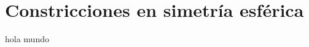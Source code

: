 \documentclass[11pt,twoside,openright,spanish]{report}
\numberwithin{equation}{chapter}
\numberwithin{figure}{chapter}
\numberwithin{table}{chapter}
\begin{document}
\fancyhead[LO]{}
\fancyhead[RE]{}
\pagestyle{fancy}

\chapter{Constricciones en simetría esférica}\label{desarrolloconstadm}

hola mundo


	\begin{comment}
	\chapter{Metodología para el Cálculo del Margen de Riesgo}
	
	\doublespacing
	
	\doublespacing
	
	Se calculará la base de capital para determinar el margen de riesgo de la reserva de riesgos en Curso para el ramo o tipo de seguro i de que se trate ($BC_{RRC}$) , como la cantidad que resulte de prorratear el RCS en congruencia con el riesgo subyacente por riesgos en curso, del ramo o tipo de seguros de que se trate, la base de capital se determina como:
	
	\doublespacing

$ $

\doublespacing
	
	{\centering
		${BC}_{RRC}^{}=\frac{{D}_{RRC}^{}}{\sum _{i}^{}D_{RRC}^{}+\sum _{i}^{}D_{SONR}^{}}\cdot RCS$
		\noindent
		
	}	
	
		
	\doublespacing

$ $

\doublespacing
	
	
	Donde:
	
	\doublespacing
	
		$D_{RRC}=$ Valor estimado de la desviación de las obligaciones futuras asociadas a la reserva de Riesgos en curso
	
	$D_{SONR}^{}=$ Valor estimado de la desviación de las obligaciones futuras asociadas a la reserva de obligaciones pendientes de cumplir por siniestros ocurridos pero no reportados.
	
	
	\doublespacing


\end{comment}
\end{document}
